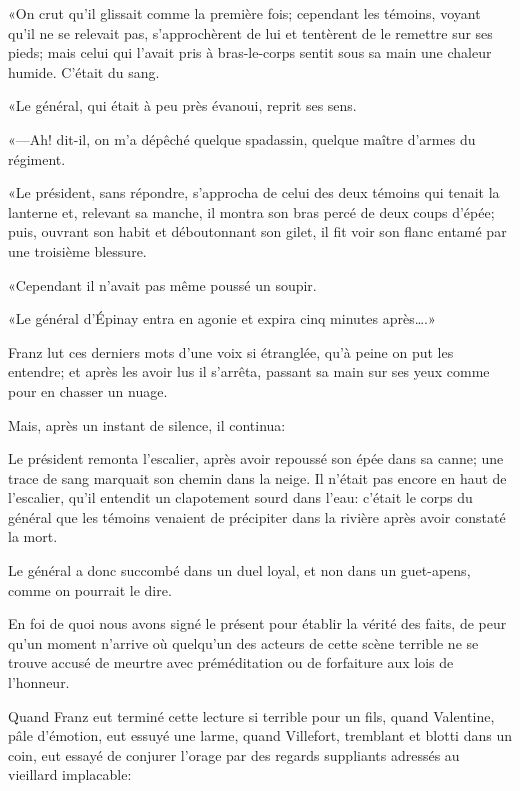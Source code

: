 «On crut qu'il glissait comme la première fois; cependant les témoins, voyant qu'il ne se relevait pas, s'approchèrent de lui et tentèrent de le remettre sur ses pieds; mais celui qui l'avait pris à bras-le-corps sentit sous sa main une chaleur humide. C'était du sang. 

«Le général, qui était à peu près évanoui, reprit ses sens. 

«—Ah! dit-il, on m'a dépêché quelque spadassin, quelque maître d'armes du régiment. 

«Le président, sans répondre, s'approcha de celui des deux témoins qui tenait la lanterne et, relevant sa manche, il montra son bras percé de deux coups d'épée; puis, ouvrant son habit et déboutonnant son gilet, il fit voir son flanc entamé par une troisième blessure. 

«Cependant il n'avait pas même poussé un soupir. 

«Le général d'Épinay entra en agonie et expira cinq minutes après\dots.» 


Franz lut ces derniers mots d'une voix si étranglée, qu'à peine on put les entendre; et après les avoir lus il s'arrêta, passant sa main sur ses yeux comme pour en chasser un nuage. 

Mais, après un instant de silence, il continua: 


\begin{mail}{}{}
Le président remonta l'escalier, après avoir repoussé son épée dans sa canne; une trace de sang marquait son chemin dans la neige. Il n'était pas encore en haut de l'escalier, qu'il entendit un clapotement sourd dans l'eau: c'était le corps du général que les témoins venaient de précipiter dans la rivière après avoir constaté la mort. 

Le général a donc succombé dans un duel loyal, et non dans un guet-apens, comme on pourrait le dire. 

En foi de quoi nous avons signé le présent pour établir la vérité des faits, de peur qu'un moment n'arrive où quelqu'un des acteurs de cette scène terrible ne se trouve accusé de meurtre avec préméditation ou de forfaiture aux lois de l'honneur. 

\end{mail}

Quand Franz eut terminé cette lecture si terrible pour un fils, quand Valentine, pâle d'émotion, eut essuyé une larme, quand Villefort, tremblant et blotti dans un coin, eut essayé de conjurer l'orage par des regards suppliants adressés au vieillard implacable: 

